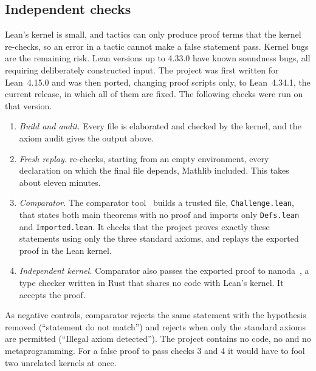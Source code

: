 \subsection{Independent checks}
Lean's kernel is small, and tactics can only produce proof terms that the kernel re-checks, so an error
in a tactic cannot make a false statement pass. Kernel bugs are the remaining risk. Lean versions up to
4.33.0 have known soundness bugs, all requiring deliberately constructed input. The project was first
written for Lean~4.15.0 and was then ported, changing proof scripts only, to Lean~4.34.1, the current
release, in which all of them are fixed. The following checks were run on that version.
\begin{enumerate}[leftmargin=1.8em]
\item \emph{Build and audit.} Every file is elaborated and checked by the kernel, and the axiom audit
  gives the output above.
\item \emph{Fresh replay.}  re-checks, starting from an empty
  environment, every declaration on which the final file depends, Mathlib included. This takes about eleven minutes.
\item \emph{Comparator.} The comparator tool~\cite{comparator} builds a trusted file,
  \texttt{Challenge.lean}, that states both main theorems with no proof and imports only
  \texttt{Defs.lean} and \texttt{Imported.lean}. It checks that the project proves exactly these statements using only the three
  standard axioms, and replays the exported proof in the Lean kernel.
\item \emph{Independent kernel.} Comparator also passes the exported proof to nanoda~\cite{nanoda}, a type
  checker written in Rust that shares no code with Lean's kernel. It accepts the proof.
\end{enumerate}
As negative controls, comparator rejects the same statement with the hypothesis  removed
(``statement do not match'') and rejects  when only the standard axioms are
permitted (``Illegal axiom detected''). The project contains no  code, no
 and no metaprogramming. For a false proof to pass checks 3 and 4 it would have to
fool two unrelated kernels at once.

